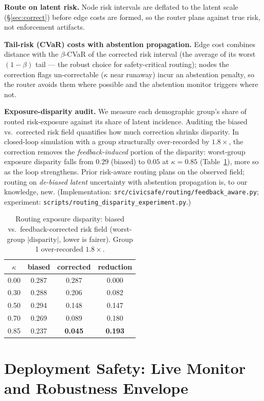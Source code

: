 \documentclass[10pt]{article}
\begin{document}
\textbf{Route on latent risk.} Node risk intervals are deflated to the latent
scale (\S\ref{sec:correct}) before edge costs are formed, so the router plans
against true risk, not enforcement artifacts.

\textbf{Tail-risk (CVaR) costs with abstention propagation.} Edge cost combines
distance with the $\beta$-CVaR of the corrected risk interval (the average of its
worst $(1-\beta)$ tail --- the robust choice for safety-critical routing); nodes
the correction flags un-correctable ($\kappa$ near runaway) incur an abstention
penalty, so the router avoids them where possible and the abstention monitor
triggers where not.

\textbf{Exposure-disparity audit.} We measure each demographic group's share of
routed risk-exposure against its share of latent incidence. Auditing the biased
vs.\ corrected risk field quantifies how much correction shrinks disparity. In
closed-loop simulation with a group structurally over-recorded by $1.8\times$,
the correction removes the \emph{feedback-induced} portion of the disparity:
worst-group exposure disparity falls from $0.29$ (biased) to $0.05$ at
$\kappa{=}0.85$ (Table~\ref{tab:routing}), more so as the loop strengthens. Prior
risk-aware routing plans on the observed field; routing on \emph{de-biased latent}
uncertainty with abstention propagation is, to our knowledge, new. (Implementation:
\texttt{src/civicsafe/routing/feedback\_aware.py}; experiment:
\texttt{scripts/routing\_disparity\_experiment.py}.)

\begin{table}[h]
\centering
\caption{Routing exposure disparity: biased vs.\ feedback-corrected risk field
(worst-group $|\text{disparity}|$, lower is fairer). Group 1 over-recorded
$1.8\times$.}
\label{tab:routing}
\begin{tabular}{cccc}
\toprule
$\kappa$ & biased & corrected & reduction \\
\midrule
0.00 & 0.287 & 0.287 & 0.000 \\
0.30 & 0.288 & 0.206 & 0.082 \\
0.50 & 0.294 & 0.148 & 0.147 \\
0.70 & 0.269 & 0.089 & 0.180 \\
0.85 & 0.237 & \textbf{0.045} & \textbf{0.193} \\
\bottomrule
\end{tabular}
\end{table}

\section{Deployment Safety: Live Monitor and Robustness Envelope}
\label{sec:deploy}
\end{document}
